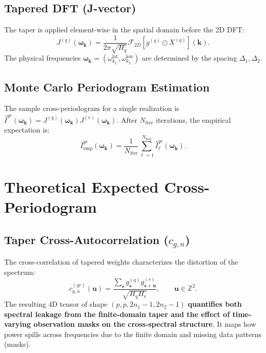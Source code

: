 \documentclass[12pt]{article}
\begin{document}
\subsection{Tapered DFT (J-vector)}
The taper is applied element-wise in the spatial domain before the 2D DFT:
\[
  J^{(q)}(\boldsymbol{\omega}_{\mathbf{k}}) = \frac{1}{2\pi\sqrt{H_q}} \mathcal{F}_{2D}[g^{(q)} \odot X^{(q)}](\mathbf{k}).
\]
The physical frequencies $\boldsymbol{\omega}_{\mathbf{k}} = (\omega^{\text{lat}}_{k_1}, \omega^{\text{lon}}_{k_2})$ are determined by the spacing $\Delta_1, \Delta_2$.

\subsection{Monte Carlo Periodogram Estimation}
The sample cross-periodogram for a single realization is $\hat{I}^{qr}(\boldsymbol{\omega}_{\mathbf{k}}) = J^{(q)}(\boldsymbol{\omega}_{\mathbf{k}}) \overline{J^{(r)}(\boldsymbol{\omega}_{\mathbf{k}})}$. After $N_{\text{iter}}$ iterations, the empirical expectation is:
\[
  \bar{I}^{qr}_{\text{emp}}(\boldsymbol{\omega}_{\mathbf{k}}) = \frac{1}{N_{\text{iter}}} \sum_{\ell=1}^{N_{\text{iter}}} \hat{I}^{qr}_{\ell}(\boldsymbol{\omega}_{\mathbf{k}}).
\]

\section{Theoretical Expected Cross-Periodogram}

\subsection{Taper Cross-Autocorrelation ($c_{g,n}$)}
The cross-correlation of tapered weights characterizes the distortion of the spectrum:
\[
  c_{g,n}^{(qr)}(\mathbf{u}) = \frac{\sum_{\mathbf{s}} g_{\mathbf{s}}^{(q)} g_{\mathbf{s}+\mathbf{u}}^{(r)}}{\sqrt{H_q H_r}}, \qquad \mathbf{u} \in \mathbb{Z}^2.
\]
The resulting 4D tensor of shape $(p, p, 2n_1-1, 2n_2-1)$ \textbf{quantifies both spectral leakage from the finite-domain taper and the effect of time-varying observation masks on the cross-spectral structure}. It maps how power spills across frequencies due to the finite domain and missing data patterns (masks).
\end{document}
